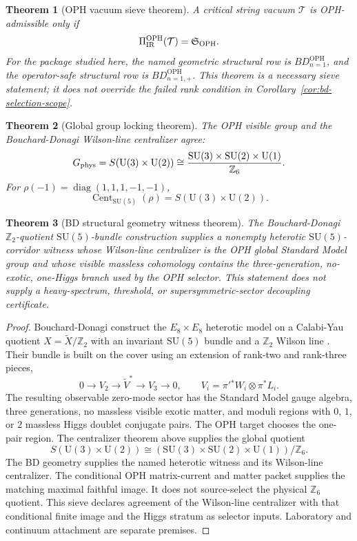 \documentclass[11pt]{article}
\newtheorem{theorem}{Theorem}[section]
\theoremstyle{remark}
\theoremstyle{plain}
\newcommand{\OPH}{\mathrm{OPH}}
\newcommand{\SU}{\mathrm{SU}}
\newcommand{\U}{\mathrm{U}}
\newcommand{\Cent}{\operatorname{Cent}}
\newcommand{\diag}{\operatorname{diag}}
\newcommand{\Z}{\mathbb Z}
\begin{document}
\begin{theorem}[OPH vacuum sieve theorem]
A critical string vacuum \(\mathcal T\) is OPH-admissible only if
\[
\Pi_{\rm IR}^{\OPH}(\mathcal T)=\mathfrak S_{\OPH}.
\]
For the package studied here, the named geometric structural row is \(BD_{n=1}^{\OPH}\), and the
operator-safe structural row is \(BD_{n=1,+}^{\OPH}\). This theorem is a necessary sieve
statement; it does not override the failed rank condition in
Corollary~\ref{cor:bd-selection-scope}.
\end{theorem}

\begin{theorem}[Global group locking theorem]
The OPH visible group and the Bouchard-Donagi Wilson-line centralizer agree:
\[
G_{\rm phys}=S(\U(3)\times\U(2))
\cong
\frac{\SU(3)\times\SU(2)\times\U(1)}{\Z_6}.
\]
For \(\rho(-1)=\diag(1,1,1,-1,-1)\),
\[
\Cent_{\SU(5)}(\rho)=S(\U(3)\times\U(2)).
\]
\end{theorem}

\begin{theorem}[BD structural geometry witness theorem]
The Bouchard-Donagi \(\Z_2\)-quotient \(\SU(5)\)-bundle construction supplies a nonempty
heterotic \(\SU(5)\)-corridor witness whose Wilson-line centralizer is the OPH global Standard
Model group and whose visible massless cohomology contains the three-generation, no-exotic,
one-Higgs branch used by the OPH selector. This statement does not supply a heavy-spectrum,
threshold, or supersymmetric-sector decoupling certificate.
\end{theorem}

\begin{proof}
Bouchard-Donagi construct the \(E_8\times E_8\) heterotic model on a Calabi-Yau quotient
\(X=\widetilde X/\Z_2\) with an invariant \(\SU(5)\) bundle and a \(\Z_2\) Wilson line
\cite{BouchardDonagi2005}. Their bundle is built on the cover using an extension of rank-two
and rank-three pieces,
\[
0\to V_2\to \widetilde V^\ast\to V_3\to0,
\qquad
V_i=\pi'{}^\ast W_i\otimes\pi^\ast L_i.
\]
The resulting observable zero-mode sector has the Standard Model gauge algebra, three generations,
no massless visible exotic matter, and moduli regions with \(0\), \(1\), or \(2\) massless Higgs
doublet conjugate pairs.
The OPH target chooses the one-pair region. The centralizer theorem above supplies the global
quotient
\[
S(\U(3)\times\U(2))
\cong
(\SU(3)\times\SU(2)\times\U(1))/\Z_6.
\]
The BD geometry supplies the named heterotic witness and its Wilson-line
centralizer. The conditional OPH matrix-current and matter packet supplies the
matching maximal faithful image. It does not source-select the physical
\(\Z_6\) quotient. This sieve declares agreement of the Wilson-line
centralizer with that conditional finite image and the Higgs stratum as
selector inputs. Laboratory and continuum attachment are separate premises.
\end{proof}
\end{document}
